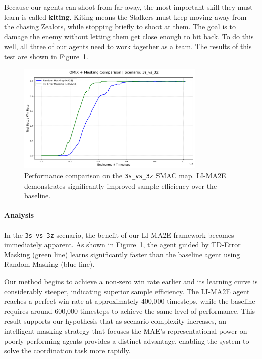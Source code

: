 Because our agents can shoot from far away, the most important skill they must learn is called \textbf{kiting}. Kiting means the Stalkers must keep moving away from the chasing Zealots, while stopping briefly to shoot at them. The goal is to damage the enemy without letting them get close enough to hit back. To do this well, all three of our agents need to work together as a team. The results of this test are shown in Figure~\ref{fig:3s_vs_3z}.

\begin{figure}[H]
    \centering
    \includegraphics[width=0.8\textwidth]{images_pfe/results_li-ma2e/comparison_plot_3s_vs_3z.png}
    \caption{Performance comparison on the \texttt{3s\_vs\_3z} SMAC map. LI-MA2E demonstrates significantly improved sample efficiency over the baseline.}
    \label{fig:3s_vs_3z}
\end{figure}

\paragraph{Analysis}
In the \texttt{3s\_vs\_3z} scenario, the benefit of our LI-MA2E framework becomes immediately apparent. As shown in Figure~\ref{fig:3s_vs_3z}, the agent guided by TD-Error Masking (green line) learns significantly faster than the baseline agent using Random Masking (blue line).

Our method begins to achieve a non-zero win rate earlier and its learning curve is considerably steeper, indicating superior sample efficiency. The LI-MA2E agent reaches a perfect win rate at approximately 400,000 timesteps, while the baseline requires around 600,000 timesteps to achieve the same level of performance. This result supports our hypothesis that as scenario complexity increases, an intelligent masking strategy that focuses the MAE's representational power on poorly performing agents provides a distinct advantage, enabling the system to solve the coordination task more rapidly.
